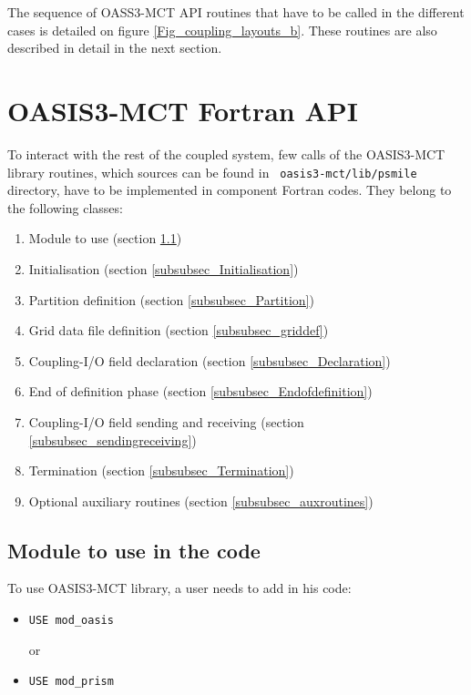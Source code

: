 The sequence of OASS3-MCT API routines that have to be called in the different cases is detailed on figure  \ref{Fig_coupling_layouts_b}.  These routines are also described in detail in the next section.

\section{OASIS3-MCT Fortran API}
\label{API}

To interact with the rest of the coupled system, few calls of the
OASIS3-MCT library routines, which sources can be found in {\tt
  oasis3-mct/lib/psmile} directory, have to be implemented in
component Fortran codes. They belong to the following classes:
\begin{enumerate}
\item Module to use (section \ref{subsubsec_Use})
\item Initialisation (section \ref{subsubsec_Initialisation})
\item Partition definition (section \ref{subsubsec_Partition})
\item Grid data file definition (section \ref{subsubsec_griddef})
\item Coupling-I/O field declaration (section
  \ref{subsubsec_Declaration})
\item End of definition phase (section
  \ref{subsubsec_Endofdefinition})
\item Coupling-I/O field sending and receiving (section
  \ref{subsubsec_sendingreceiving})
\item Termination (section \ref{subsubsec_Termination})
\item Optional auxiliary routines (section
  \ref{subsubsec_auxroutines})
\end{enumerate}

\subsection{Module to use in the code}
\label{subsubsec_Use}

To use OASIS3-MCT library, a user needs to add in his code:

\begin{itemize}

\item {\tt USE mod\_oasis}

  or

\item {\tt USE mod\_prism}
 
\end{itemize}

